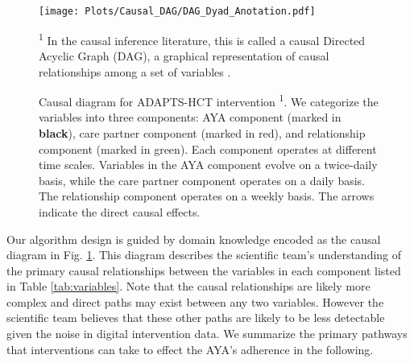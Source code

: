 \begin{figure}[hpt]
\texttt{[image: Plots/Causal\_DAG/DAG\_Dyad\_Anotation.pdf]}
    \captionsetup{parskip=0pt}
    \caption{Causal diagram for ADAPTS-HCT intervention \textsuperscript{1}. We categorize the variables into three components: AYA component (marked in \textbf{black}), care partner component (marked in \textcolor{redorange}{red}), and relationship component (marked in \textcolor{grassgreen}{green}). Each component operates at different time scales. Variables in the AYA component evolve on a twice-daily basis, while the care partner component operates on a daily basis. The relationship component operates on a weekly basis. The arrows indicate the direct causal effects.}
    \vspace{5mm}
    \small\textsuperscript{1} In the causal inference literature, this is called a causal Directed Acyclic Graph (DAG), a graphical representation of causal relationships among a set of variables \cite{pearl2000models}.
    \label{fig:dag}
\end{figure}




Our algorithm design is guided by domain knowledge encoded as the causal diagram in Fig. \ref{fig:dag}. 
This diagram describes the scientific team's understanding of  the primary causal relationships between the variables in each component listed in Table \ref{tab:variables}.  Note that  the causal relationships are likely more complex and direct paths may exist between any two variables.  However the scientific team believes that these other paths are likely to be less detectable given the noise in digital intervention data.   We summarize the  primary pathways that interventions can take to effect the AYA's adherence in the following.  %

